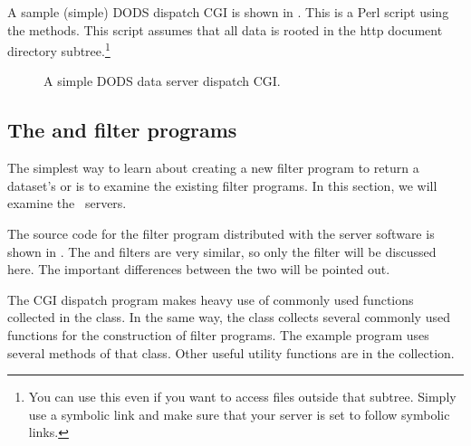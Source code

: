 A sample (simple) DODS dispatch CGI is shown in .
This is a Perl script using the  methods.  This
script assumes that all data is rooted in the http document directory
subtree.\footnote{You can use this even if you want to access files
  outside that subtree.  Simply use a symbolic link and make sure that
  your server is set to follow symbolic links.}


\begin{figure}[htb]
\W\label{fig,cgi}
\caption{A simple DODS data server dispatch CGI.}
\T\label{fig,cgi}
\end{figure}


\subsection{The  and  filter programs}

The simplest way to learn about creating a new filter program to
return a dataset's  or  is to examine the
existing filter programs.  In this section, we will examine the
\netcdf\ servers.

The source code for the  filter program distributed with
the \netcdf server software is shown in . The
 and  filters are very similar, so only the
 filter will be discussed here. The important
differences between the two will be pointed out.

The CGI dispatch program makes heavy use of commonly used
functions collected in the  class.  In the same
way, the  class collects several commonly used
functions for the construction of filter programs.  The example
program uses several methods of that class.  Other useful utility
functions are in the  collection.

